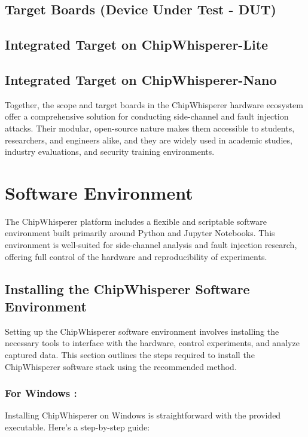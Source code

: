 \subsection{Target Boards (Device Under Test - DUT)}

\subsection{Integrated Target on ChipWhisperer-Lite}

\subsection{Integrated Target on ChipWhisperer-Nano}

Together, the scope and target boards in the ChipWhisperer hardware ecosystem offer a comprehensive solution for conducting side-channel and fault injection attacks. Their modular, open-source nature makes them accessible to students, researchers, and engineers alike, and they are widely used in academic studies, industry evaluations, and security training environments.

\section{Software Environment}
The ChipWhisperer platform includes a flexible and scriptable software environment built primarily around Python and Jupyter Notebooks. This environment is well-suited for side-channel analysis and fault injection research, offering full control of the hardware and reproducibility of experiments.

\subsection{ Installing the ChipWhisperer Software Environment}
 Setting up the ChipWhisperer software environment involves installing the necessary tools to interface with the hardware, control experiments, and analyze captured data. This section outlines the steps required to install the ChipWhisperer software stack using the recommended method.
\subsubsection{For Windows :}
Installing ChipWhisperer on Windows is straightforward with the provided executable. Here's a step-by-step guide:\newline

